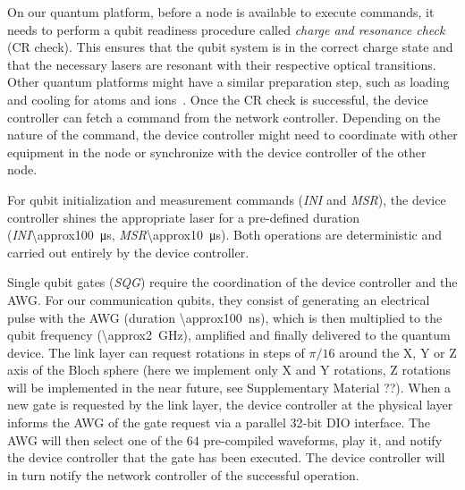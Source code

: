 On our quantum platform, before a node is available to execute commands, it needs to perform a qubit
readiness procedure called \emph{charge and resonance check} (CR check). This ensures that the qubit
system is in the correct charge state and that the necessary lasers are resonant with their
respective optical transitions. Other quantum platforms might have a similar preparation step, such
as loading and cooling for atoms and ions~\cite{stephenson_2020_highrate, ritter_2012_elementary}.
Once the CR check is successful, the device controller can fetch a command from the network
controller. Depending on the nature of the command, the device controller might need to coordinate
with other equipment in the node or synchronize with the device controller of the other node.

For qubit initialization and measurement commands (\emph{INI} and \emph{MSR}), the device controller
shines the appropriate laser for a pre-defined duration (\emph{INI}\qty{\approx100}{\us},
\emph{MSR}\qty{\approx10}{\us}). Both operations are deterministic and carried out entirely by the
device controller.

Single qubit gates (\emph{SQG}) require the coordination of the device controller and the AWG. For
our communication qubits, they consist of generating an electrical pulse with the AWG (duration
\qty{\approx100}{\ns}), which is then multiplied to the qubit frequency (\qty{\approx2}{\GHz}),
amplified and finally delivered to the quantum device. The link layer can request rotations in steps
of $\pi/16$ around the X, Y or Z axis of the Bloch sphere (here we implement only X and Y rotations,
Z rotations will be implemented in the near future, see Supplementary Material ??). When a new gate
is requested by the link layer, the device controller at the physical layer informs the AWG of the
gate request via a parallel \num{32}-bit DIO interface. The AWG will then select one of the $64$
pre-compiled waveforms, play it, and notify the device controller that the gate has been executed.
The device controller will in turn notify the network controller of the successful operation.


